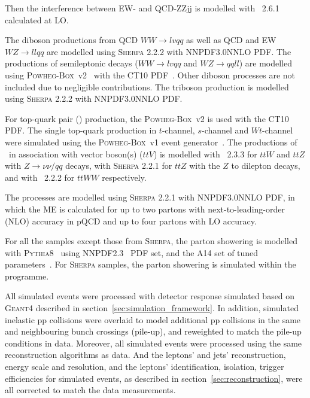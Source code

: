 Then the interference between EW- and QCD-ZZjj is modelled with \MGMCatNLO~2.6.1 calculated at LO.

The diboson productions from QCD $WW \rightarrow lvqq$ as well as QCD and EW $WZ \rightarrow llqq$ are modelled using \textsc{Sherpa} 2.2.2 with NNPDF3.0NNLO PDF.
The productions of semileptonic decays ($WW \rightarrow lvqq$ and $WZ \rightarrow qqll$) are modelled using \textsc{Powheg-Box}~v2~\cite{Frixione:2007nw} with the CT10 PDF~\cite{Lai:2010vv}.
Other diboson processes are not included due to negligible contributions.
The triboson production is modelled using \textsc{Sherpa} 2.2.2 with NNPDF3.0NNLO PDF.

For top-quark pair (\ttbar) production, the \textsc{Powheg-Box}~v2 is used with the CT10 PDF.
The single top-quark production in $t$-channel, $s$-channel and $Wt$-channel were simulated using the \textsc{Powheg-Box}~v1 event generator~\cite{Alioli:2009je,Frederix:2012dh,Re:2010bp}.
The productions of \ttbar~in association with vector boson(s) ($ttV$) is modelled with \MGMCatNLO~2.3.3 for $ttW$ and $ttZ$ with $Z \rightarrow \nu\nu/qq$ decays,
with \textsc{Sherpa} 2.2.1 for $ttZ$ with the $Z$ to dilepton decays,
and with \MGMCatNLO~2.2.2 for $ttWW$ respectively.

The \Zjet processes are modelled using \textsc{Sherpa} 2.2.1 with NNPDF3.0NNLO PDF, 
in which the ME is calculated for up to two partons with next-to-leading-order (NLO) accuracy in pQCD and up to four partons with LO accuracy.

For all the samples except those from \textsc{Sherpa}, 
the parton showering is modelled with \textsc{Pythia8}~\cite{Sjostrand:2007gs} using NNPDF2.3~\cite{Ball:2012cx} PDF set,
and the A14 set of tuned parameters~\cite{ATL-PHYS-PUB-2014-021}.
For \textsc{Sherpa} samples, the parton showering is simulated within the programme.

All simulated events were processed with detector response simulated based on \textsc{Geant4} described in section~\ref{sec:simulation_framework}.
In addition, simulated inelastic pp collisions were overlaid to model additional pp collisions in the same and neighbouring bunch crossings (pile-up),
and reweighted to match the pile-up conditions in data.
Moreover, all simulated events were processed using the same reconstruction algorithms as data.
And the leptons' and jets' reconstruction, energy scale and resolution, and the leptons' identification, isolation, trigger efficiencies for simulated events,
as described in section~\ref{sec:reconstruction}, were all corrected to match the data measurements.
